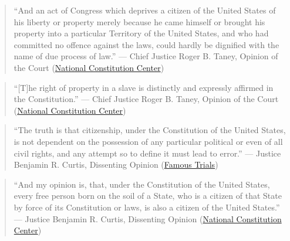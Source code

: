 \documentclass[12pt]{article}
\begin{document}
\begin{quote}
``And an act of Congress which deprives a citizen of the United States of his liberty or property merely because he came himself or brought his property into a particular Territory of the United States, and who had committed no offence against the laws, could hardly be dignified with the name of due process of law.'' --- Chief Justice Roger B. Taney, Opinion of the Court (\href{https://constitutioncenter.org/the-constitution/supreme-court-case-library/dred-scott-v-sandford}{National Constitution Center})
\end{quote}

\begin{quote}
``[T]he right of property in a slave is distinctly and expressly affirmed in the Constitution.'' --- Chief Justice Roger B. Taney, Opinion of the Court (\href{https://constitutioncenter.org/the-constitution/supreme-court-case-library/dred-scott-v-sandford}{National Constitution Center})
\end{quote}

\begin{quote}
``The truth is that citizenship, under the Constitution of the United States, is not dependent on the possession of any particular political or even of all civil rights, and any attempt so to define it must lead to error.'' --- Justice Benjamin R. Curtis, Dissenting Opinion (\href{https://famous-trials.com/dredscott/2545-scott-v-sandford-the-dissent}{Famous Trials})
\end{quote}

\begin{quote}
``And my opinion is, that, under the Constitution of the United States, every free person born on the soil of a State, who is a citizen of that State by force of its Constitution or laws, is also a citizen of the United States.'' --- Justice Benjamin R. Curtis, Dissenting Opinion (\href{https://constitutioncenter.org/the-constitution/supreme-court-case-library/dred-scott-v-sandford}{National Constitution Center})
\end{quote}
\end{document}
